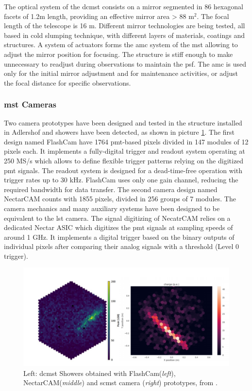 \documentclass[main.tex]{subfiles}
\begin{document}
The optical system of the \gls{dcmst} consists on a mirror segmented in 86 hexagonal facets of 1.2m length, providing an effective mirror area > 88 m$^2$. The focal length of the telescope is 16 m.
Different mirror technologies are being tested, all based in cold slumping technique, with different layers of materials, coatings and structures. A system of actuators forms the \gls{amc} system of the \gls{mst} allowing to adjust the mirror position for focusing. The structure is stiff enough to make unnecessary to readjust during observations to maintain the \gls{psf}. The \gls{amc} is used only for the initial mirror adjustment and for maintenance activities, or adjust the focal distance for specific observations.

\subsubsection{\gls{mst} Cameras}

Two camera prototypes have been designed and tested in the structure installed in Adlershof and showers have been detected, as shown in picture \ref{fig:MSTcamerasimg}.
The first design named FlashCam have 1764 \gls{pmt}-based pixels divided in 147 modules of 12 pixels each. It implements a fully-digital trigger and readout system operating at 250 MS/s which allows to define flexible trigger patterns relying on the digitized \gls{pmt} signals. The readout system is designed for a dead-time-free operation with trigger rates up to 30 kHz. FlashCam uses only one gain channel, reducing the required bandwidth for data transfer. 
The second camera design named NectarCAM counts with 1855 pixels, divided in 256 groups of 7 modules. The camera mechanics and many auxiliary systems have been designed to be equivalent to the \gls{lst} camera. The signal digitizing of NecatrCAM relies on a dedicated Nectar ASIC which digitizes the \gls{pmt} signals at sampling speeds of around 1 GHz. It implements a digital trigger based on the binary outputs of individual pixels after comparing their analog signals with a threshold (Level 0 trigger).\\

\begin{figure}[h]
\centering
 \includegraphics[width=\textwidth]{Pictures/showerimagesMST.pdf}
  \caption{Left: \gls{dcmst} Showers obtained with FlashCam(\textit{left}), NectarCAM(\textit{middle}) and \gls{scmst} camera (\textit{right}) prototypes, from \cite{2019MSTreport}.}
    \label{fig:MSTcamerasimg}
\end{figure}
\end{document}
